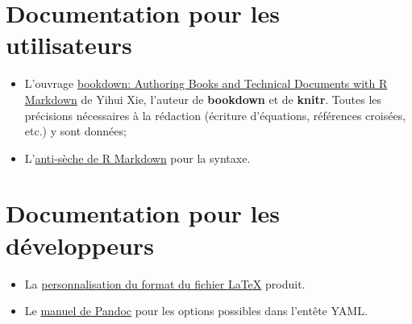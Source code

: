 \documentclass[
  11pt,
  american,
  a4paper,
  extrafontsizes,onecolumn,openright
  ]{memoir}
\begin{document}
\hypertarget{documentation-pour-les-utilisateurs}{%
\section{Documentation pour les utilisateurs}\label{documentation-pour-les-utilisateurs}}

\begin{itemize}
\item
  L'ouvrage \href{https://bookdown.org/yihui/bookdown/}{bookdown: Authoring Books and Technical Documents with R Markdown} de Yihui Xie, l'auteur de \textbf{bookdown} et de \textbf{knitr}. Toutes les précisions nécessaires à la rédaction (écriture d'équations, références croisées, etc.) y sont données;
\item
  L'\href{https://www.rstudio.com/wp-content/uploads/2015/02/rmarkdown-cheatsheet.pdf}{anti-sèche de R Markdown} pour la syntaxe.
\end{itemize}

\hypertarget{sec:docdev}{%
\section{Documentation pour les développeurs}\label{sec:docdev}}

\begin{itemize}
\item
  La \href{http://rmarkdown.rstudio.com/pdf_document_format.html\#advanced_customization}{personnalisation du format du fichier LaTeX} produit.
\item
  Le \href{https://pandoc.org/MANUAL.html}{manuel de Pandoc} pour les options possibles dans l'entête YAML.
\end{itemize}



\backmatter
\SmallMargins

%
\twocolumn
\renewcommand*{\bibfont}{\scriptsize}
\printbibliography
\onecolumn










\evenpage
\SmallMargins
\thispagestyle{empty}
\end{document}
